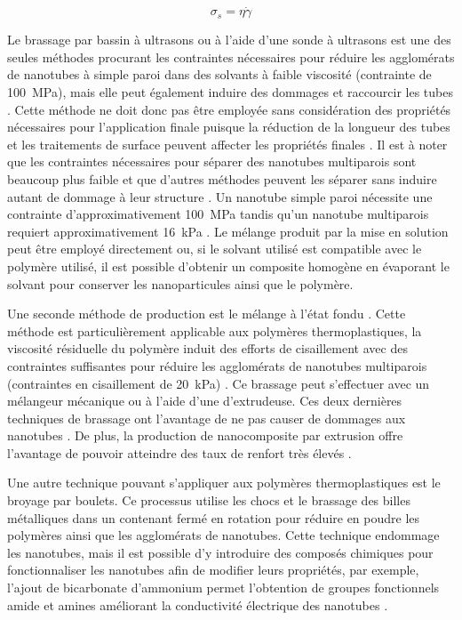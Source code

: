 \begin{equation}
\sigma_s = \eta \dot{\gamma}
\end{equation}

Le brassage par bassin à ultrasons ou à l'aide d'une sonde à ultrasons est une des seules méthodes procurant les contraintes nécessaires pour réduire les agglomérats de nanotubes à simple paroi dans des solvants à faible viscosité (contrainte de \SI[locale=FR]{100}{\mega\pascal}), mais elle peut également induire des dommages et raccourcir les tubes \cite{Huang2012}. 
Cette méthode ne doit donc pas être employée sans considération des propriétés nécessaires pour l'application finale puisque la réduction de la longueur des tubes et les traitements de surface peuvent affecter les propriétés finales \cite{Grossiord2008a, Diez-Pascual2010, Ma2008}.  
Il est à noter que les contraintes nécessaires pour séparer des nanotubes multiparois sont beaucoup plus faible et que d'autres méthodes peuvent les séparer sans induire autant de dommage à leur structure \cite{Huang2012, Ma2010}. 
Un nanotube simple paroi nécessite une contrainte d'approximativement \SI[locale=FR]{100}{\mega\pascal} tandis qu'un nanotube multiparois requiert approximativement \SI[locale=FR]{16}{\kilo\pascal} \cite{Huang2012}. 
Le mélange produit par la mise en solution peut être employé directement ou, si le solvant utilisé est compatible avec le polymère utilisé, il est possible d'obtenir un composite homogène en évaporant le solvant pour conserver les nanoparticules ainsi que le polymère. 

Une seconde méthode de production est le mélange à l'état fondu \cite{Ma2010}. 
Cette méthode est particulièrement applicable aux polymères thermoplastiques, la viscosité résiduelle du polymère induit des efforts de cisaillement avec des contraintes suffisantes pour réduire les agglomérats de nanotubes multiparois (contraintes en cisaillement de \SI[locale=FR]{20}{\kilo\pascal}) \cite{Huang2012}. 
Ce brassage peut s'effectuer avec un mélangeur mécanique ou à l'aide d'une d'extrudeuse. 
Ces deux dernières techniques de brassage ont l'avantage de ne pas causer de dommages aux nanotubes \cite{Ma2010}. 
De plus, la production de nanocomposite par extrusion offre l'avantage de pouvoir atteindre des taux de renfort très élevés \cite{Ma2010}. 

Une autre technique pouvant s'appliquer aux polymères thermoplastiques est le broyage par boulets. 
Ce processus utilise les chocs et le brassage des billes métalliques dans un contenant fermé en rotation pour réduire en poudre les polymères ainsi que les agglomérats de nanotubes.
Cette technique endommage les nanotubes, mais il est possible d'y introduire des composés chimiques pour fonctionnaliser les nanotubes afin de modifier leurs propriétés, par exemple, l'ajout de bicarbonate d'ammonium permet l'obtention de groupes fonctionnels amide et amines améliorant la conductivité électrique des nanotubes \cite{Ma2010, Ma2008a}. 

